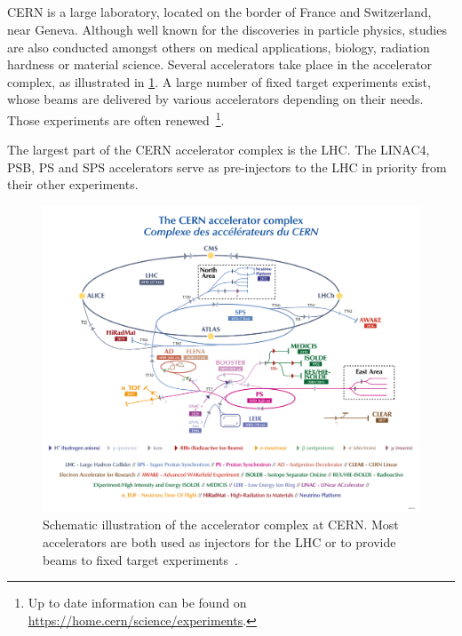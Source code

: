 
\subsection{}

CERN is a large laboratory, located on the border of France and Switzerland, near Geneva. Although
well known for the discoveries in particle physics, studies are also conducted amongst others on
medical applications, biology, radiation hardness or material science.
Several accelerators take place in the accelerator complex, as illustrated in
\cref{fig:introduction:cern_complex}. A large number of fixed target experiments exist, whose
beams are delivered by various accelerators depending on their needs. Those experiments are often
renewed~\footnote{Up to date information can be found on
\href{https://home.cern/science/experiments}{https://home.cern/science/experiments}.}.

The largest part of the CERN accelerator complex is the LHC. The LINAC4, PSB, PS and SPS
accelerators serve as pre-injectors to the LHC in priority from their other experiments.

\begin{figure}[!htb]
    \centering
    \includegraphics[width=1\textwidth]{images/cern_complex.png}
    \caption{Schematic illustration of the accelerator complex at CERN. Most accelerators are both
    used as injectors for the LHC or to provide beams to fixed target
    experiments~\cite{noauthor_cern_2022}.}
    \label{fig:introduction:cern_complex}
\end{figure}


